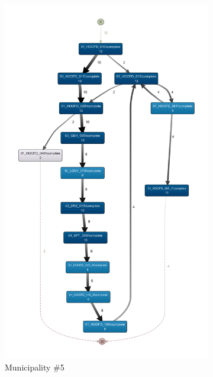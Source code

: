 \begin{figure}
\begin{subfigure}{.4\textwidth}
    \centering
        \includegraphics[width=.8\linewidth]{5_results_discussions/coselog-wabo/coselog-wabo-4-simplified}
    \caption{Municipality \#5}
    \label{fig:coselog-wabo-process-models-simplified-4}
  \end{subfigure}
    \begin{subfigure}{.4\textwidth}
    \centering

\end{subfigure}
\end{figure}
